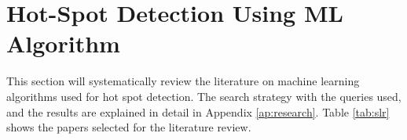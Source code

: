 

\section{Hot-Spot Detection Using ML Algorithm}
\label{sec:hotspotstateart}
This section will systematically review the literature on machine learning algorithms used for hot spot detection. The search strategy with the queries used, and the results are explained in detail in Appendix \ref{ap:research}. Table \ref{tab:slr} shows the papers selected for the literature review.

